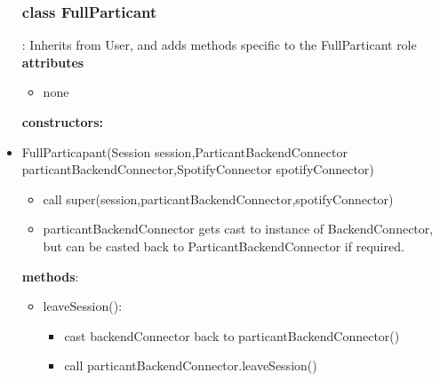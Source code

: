 \documentclass[oneside, nenglish]{sdqtechreport}
\begin{document}
\begin{itemize}
\subsubsection{class FullParticant}:
Inherits from User, and adds methods specific to the FullParticant role 
\textbf{attributes}
\begin{itemize}
    \item none
\end{itemize}
\textbf{constructors:}
\item FullParticapant(Session session,ParticantBackendConnector particantBackendConnector,SpotifyConnector spotifyConnector) 
\begin{itemize}
    \item call super(session,particantBackendConnector,spotifyConnector)
    \item particantBackendConnector gets cast to instance of BackendConnector, but can be casted back to ParticantBackendConnector if required.
\end{itemize}
\textbf{methods}:
\begin{itemize}
    \item leaveSession():
    \begin{itemize}
        \item cast backendConnector back to particantBackendConnector()
        \item call particantBackendConnector.leaveSession()
    \end{itemize}
\end{itemize}


\end{itemize}
\end{document}
